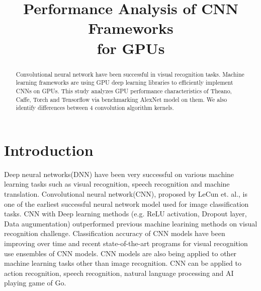 \documentclass[conference]{IEEEtran}
\begin{document}
\title{Performance Analysis of CNN Frameworks\\for GPUs}

\author{
\and
{}
}

\maketitle

\begin{abstract}
Convolutional neural network have been successful in visual recognition tasks.
Machine learning frameworks are using GPU deep learning libraries to efficiently implement CNNs on GPUs.
This study analyzes GPU performance characteristics of Theano, Caffe, Torch and Tensorflow via benchmarking AlexNet model on them.
We also identify differences between 4 convolution algorithm kernels.

\end{abstract}

\IEEEpeerreviewmaketitle

\section{Introduction}

Deep neural networks(DNN) have been very successful on various machine learning tasks such as visual recognition, speech recognition and machine translation.
\cite{}%
Convolutional neural network(CNN), proposed by LeCun et. al., is one of the earliest successful neural network model used for image classification tasks.
\cite{}%
CNN with Deep learning methods (e.g. ReLU activation, Dropout layer, Data augumentation) outperformed previous machine learining methods on visual recognition challenge.
\cite{}%
Classification accuracy of CNN models have been improving over time and recent state-of-the-art programs for visual recognition use ensembles of CNN models.
\cite{}%
CNN models are also being applied to other machine learning tasks other than image recognition. CNN can be applied to action recognition, speech recognition, natural language processing and AI playing game of Go.
\cite{}%
\end{document}
